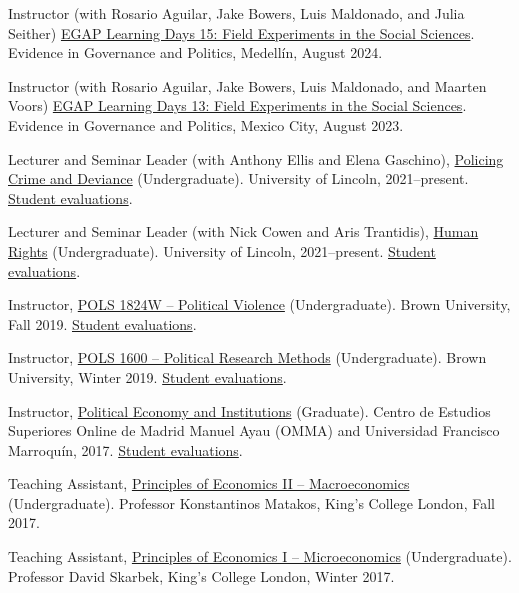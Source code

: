 \documentclass[a4paper]{article}
\renewenvironment{itemize}{
	\begin{list}{}{
			\setlength{\leftmargin}{1.5em}
		}
		}{
	\end{list}
}
\begin{document}
\begin{itemize}
\item Instructor (with Rosario Aguilar, Jake Bowers, Luis Maldonado, and Julia Seither) \href{https://egap.org/project/learning-days-15-latin-america-regional-hub-workshop/}{EGAP Learning Days 15: Field Experiments in the Social Sciences}. Evidence in Governance and Politics, Medellín, August 2024.	
\item Instructor (with Rosario Aguilar, Jake Bowers, Luis Maldonado, and Maarten Voors) \href{https://egap.org/project/learning-days-13-latin-america-regional-hub-workshop/}{EGAP Learning Days 13: Field Experiments in the Social Sciences}. Evidence in Governance and Politics, Mexico City, August 2023.	
\item Lecturer and Seminar Leader (with Anthony Ellis and Elena Gaschino), \href{https://blackboard.lincoln.ac.uk/ultra/courses/_182116_1/cl/outline}{Policing Crime and Deviance} (Undergraduate). University of Lincoln, 2021--present. \href{https://danilofreire.github.io/evaluations/eval-pcd-2023.xlsx}{Student evaluations}.
\item Lecturer and Seminar Leader (with Nick Cowen and Aris Trantidis), \href{https://blackboard.lincoln.ac.uk/ultra/courses/_184943_1/cl/outline}{Human Rights} (Undergraduate). University of Lincoln, 2021--present. \href{https://danilofreire.github.io/evaluations/eval-hr-2122.xlsx}{Student evaluations}.
\item Instructor, \href{https://danilofreire.github.io/pols1824w/}{POLS 1824W -- Political Violence} (Undergraduate). Brown University, Fall 2019. \href{https://danilofreire.github.io/evaluations/eval-pol-vio.pdf}{Student evaluations}.
\item Instructor, \href{https://pols1600.github.io/}{POLS 1600 -- Political Research Methods} (Undergraduate). Brown University, Winter 2019. \href{https://danilofreire.github.io/evaluations/eval-pol-meth.pdf}{Student evaluations}.
\item Instructor, \href{https://github.com/danilofreire/economia-politica-instituicoes-ufm}{Political Economy and Institutions} (Graduate). Centro de Estudios Superiores Online de Madrid Manuel Ayau (OMMA) and Universidad Francisco Marroquín, 2017. \href{https://danilofreire.github.io/evaluations/eval-ufm.pdf}{Student evaluations}.
\item Teaching Assistant, \href{https://github.com/danilofreire/core-econ}{Principles of Economics II -- Macroeconomics} (Undergraduate). Professor Konstantinos Matakos, King's College London, Fall 2017.
\item Teaching Assistant, \href{https://github.com/danilofreire/core-econ}{Principles of Economics I -- Microeconomics} (Undergraduate). Professor David Skarbek, King's College London, Winter 2017.
\end{itemize}
\end{document}
